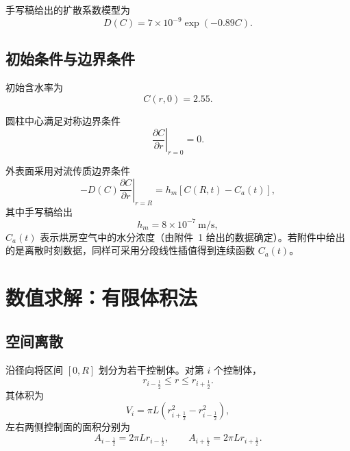 \documentclass[UTF8,a4paper,12pt]{ctexart}
\begin{document}
手写稿给出的扩散系数模型为
\begin{equation}
    D(C)=7\times 10^{-9}\exp(-0.89C).
    \label{eq:Dc}
\end{equation}

\subsection{初始条件与边界条件}

初始含水率为
\begin{equation}
    C(r,0)=2.55.
\end{equation}

圆柱中心满足对称边界条件
\begin{equation}
    \left.\frac{\partial C}{\partial r}\right|_{r=0}=0.
    \label{eq:moisture-center-bc}
\end{equation}

外表面采用对流传质边界条件
\begin{equation}
    -D(C)
    \left.\frac{\partial C}{\partial r}\right|_{r=R}
    =
    h_m\left[C(R,t)-C_a(t)\right],
    \label{eq:moisture-surface-bc}
\end{equation}
其中手写稿给出
\begin{equation}
    h_m=8\times 10^{-7}\ \mathrm{m/s},
\end{equation}
$C_a(t)$ 表示烘房空气中的水分浓度（由附件~1 给出的数据确定）。若附件中给出的是离散时刻数据，同样可采用分段线性插值得到连续函数 $C_a(t)$。

\section{数值求解：有限体积法}

\subsection{空间离散}

沿径向将区间 $[0,R]$ 划分为若干控制体。对第 $i$ 个控制体，
\begin{equation}
    r_{i-\frac12}\le r\le r_{i+\frac12}.
\end{equation}
其体积为
\begin{equation}
    V_i
    =
    \pi L
    \left(
        r_{i+\frac12}^2-r_{i-\frac12}^2
    \right),
    \label{eq:volume}
\end{equation}
左右两侧控制面的面积分别为
\begin{equation}
    A_{i-\frac12}=2\pi Lr_{i-\frac12},
    \qquad
    A_{i+\frac12}=2\pi Lr_{i+\frac12}.
    \label{eq:area}
\end{equation}
\end{document}
